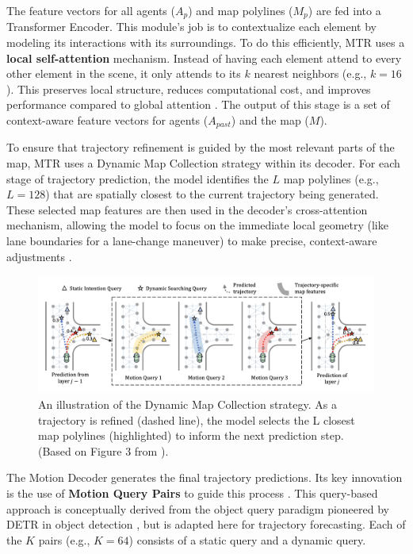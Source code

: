 The feature vectors for all agents ($A_p$) and map polylines ($M_p$) are fed into a Transformer Encoder. This module's job is to contextualize each element by modeling its interactions with its surroundings. To do this efficiently, MTR uses a \textbf{local self-attention} mechanism. Instead of having each element attend to every other element in the scene, it only attends to its $k$ nearest neighbors (e.g., $k=16$). This preserves local structure, reduces computational cost, and improves performance compared to global attention \cite{Shi2022MTR}. The output of this stage is a set of context-aware feature vectors for agents ($A_{past}$) and the map ($M$).

\label{subsec:dynamic_map_collection_strategy}
To ensure that trajectory refinement is guided by the most relevant parts of the map, MTR uses a Dynamic Map Collection strategy within its decoder. For each stage of trajectory prediction, the model identifies the $L$ map polylines (e.g., $L=128$) that are spatially closest to the current trajectory being generated. These selected map features are then used in the decoder's cross-attention mechanism, allowing the model to focus on the immediate local geometry (like lane boundaries for a lane-change maneuver) to make precise, context-aware adjustments \cite{Shi2022MTR}.

\begin{figure}[htbp]
    \centering
    \includegraphics[width=\textwidth]{figures/dynamic_map.png}
    \caption{An illustration of the Dynamic Map Collection strategy. As a trajectory is refined (dashed line), the model selects the L closest map polylines (highlighted) to inform the next prediction step. (Based on Figure 3 from \cite{Shi2022MTR}).}
    \label{fig:dynamic_map}
\end{figure}

The Motion Decoder generates the final trajectory predictions. Its key innovation is the use of \textbf{Motion Query Pairs} to guide this process \cite{Shi2022MTR}. This query-based approach is conceptually derived from the object query paradigm pioneered by DETR in object detection \cite{DETR2020}, but is adapted here for trajectory forecasting. Each of the $K$ pairs (e.g., $K=64$) consists of a static query and a dynamic query.

